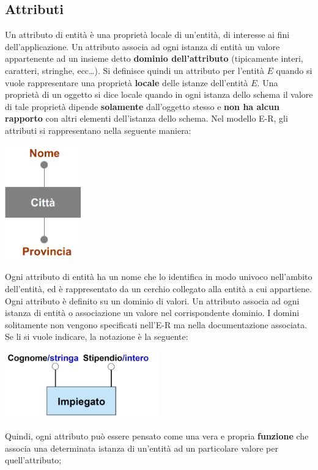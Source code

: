 \documentclass[12pt]{article}
\begin{document}
\subsection{Attributi}
Un attributo di entità è una proprietà locale di un'entità, di interesse ai fini dell'applicazione.
Un attributo associa ad ogni istanza di entità un valore appartenente ad un insieme detto \textbf{dominio dell'attributo} (tipicamente interi, caratteri, stringhe, ecc\dots).
Si definisce quindi un attributo per l'entità $E$ quando si vuole rappresentare una proprietà \textbf{locale} delle istanze dell'entità $E$.
Una proprietà di un oggetto si dice locale quando in ogni istanza dello schema il valore di tale proprietà dipende \textbf{solamente} dall'oggetto stesso e \textbf{non ha alcun rapporto} con altri elementi dell'istanza dello schema.
Nel modello E-R, gli attributi si rappresentano nella seguente maniera:
\begin{center}
    \includegraphics[width = 0.25\textwidth]{Images/17.PNG}
\end{center}
Ogni attributo di entità ha un nome che lo identifica in modo univoco nell'ambito dell'entità, ed è rappresentato da un cerchio collegato alla entità a cui appartiene.
Ogni attributo è definito su un dominio di valori. Un attributo associa ad ogni istanza di entità o associazione un valore nel corrispondente dominio.
I domini solitamente non vengono specificati nell'E-R ma nella documentazione associata. Se li si vuole indicare, la notazione è la seguente:
\begin{center}
    \includegraphics[width = 0.50\textwidth]{Images/18.PNG}
\end{center}
Quindi, ogni attributo può essere pensato come una vera e propria \textbf{funzione} che associa una determinata istanza di un'entità ad un particolare valore per quell'attributo;
\end{document}
